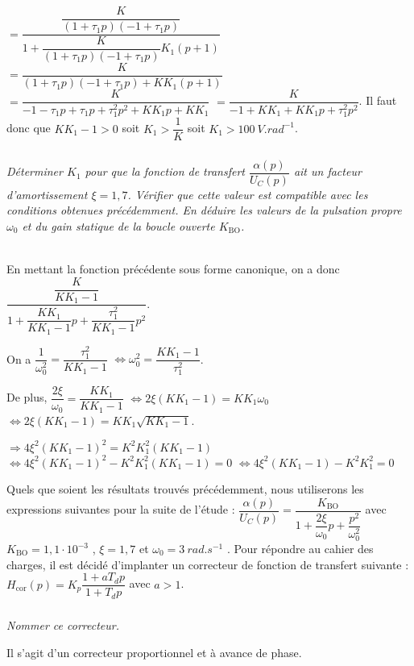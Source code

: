 \begin{multicols}{2}
\begin{corrige}
$=\dfrac{\dfrac{K}{(1+\tau_1p)(-1+ \tau_1p)}}{1+\dfrac{K}{(1+\tau_1p)(-1+ \tau_1p)} K_1(p+1) }$
$=\dfrac{K}{(1+\tau_1p)(-1+ \tau_1p)+K K_1(p+1) }$
$=\dfrac{K}{-1-\tau_1p+\tau_1p + \tau_1^2p^2+K K_1p+K K_1 }$
$=\dfrac{K}{-1+K K_1  +K K_1p + \tau_1^2p^2}$. Il faut donc que $KK_1 -1>0$ soit $K_1 >\dfrac{1}{K}$ soit $K_1>\SI{100}{V.rad^{-1}}$.
\end{corrige}
\else
\fi



\subparagraph{} \textit{Déterminer $K_1$ pour que la fonction de transfert $\dfrac{\alpha (p)}{U_C(p)}$
 ait un facteur d'amortissement $\xi=1,7$.
Vérifier que cette valeur est compatible avec les conditions obtenues précédemment. En déduire les
valeurs de la pulsation propre $\omega_0$ et du gain statique de la boucle ouverte $K_{\text{BO}}$.}
\ifprof
\begin{corrige}~\\

En mettant la fonction précédente sous forme canonique, on a donc $\dfrac{\dfrac{K}{K K_1-1}}{ 1 +\dfrac{K K_1}{K K_1-1}p + \dfrac{\tau_1^2}{K K_1-1}p^2}$.

On a $\dfrac{1}{\omega_0^2}= \dfrac{\tau_1^2}{K K_1-1}$ $\Leftrightarrow {\omega_0^2}= \dfrac{K K_1-1}{\tau_1^2}$. 

De plus, $\dfrac{2\xi}{\omega_0} = \dfrac{K K_1}{K K_1-1}$ $\Leftrightarrow 2\xi \left( K K_1-1 \right) = K K_1 \omega_0$  $\Leftrightarrow 2\xi \left( K K_1-1 \right) = K K_1 \sqrt{K K_1-1}$.

 $\Rightarrow 4\xi^2 \left( K K_1-1 \right)^2 = K^2 K_1^2 \left(K K_1-1\right)$
  $\Leftrightarrow 4\xi^2 \left( K K_1-1 \right)^2 - K^2 K_1^2 \left(K K_1-1\right)=0$
    $\Leftrightarrow 4\xi^2 \left( K K_1-1 \right) - K^2 K_1^2 =0$
\end{corrige}
\else
\fi

\ifprof
\else
Quels que soient les résultats trouvés précédemment, nous utiliserons les expressions suivantes pour la suite
de l'étude : $\dfrac{\alpha (p)}{U_C(p)} = \dfrac{K_{\text{BO}}}{1+\dfrac{2\xi}{\omega_0}p+\dfrac{p^2}{\omega_0^2}}$
avec $K_{\text{BO}}=1,1\cdot 10^{-3}$ , $\xi=1,7$ et $\omega_0=\SI{3}{rad.s^{-1}}$ . Pour répondre au cahier des
charges, il est décidé d'implanter un correcteur de fonction de transfert suivante : $H_{\text{cor}} (p)=K_p \dfrac{1+aT_d p}{1+T_d p}$ avec $a>1$.

\fi

\subparagraph{} \textit{Nommer ce correcteur.}
\ifprof
\begin{corrige}
Il s'agit d'un correcteur proportionnel et à avance de phase. 
\end{corrige}
\else
\fi


\end{multicols}
